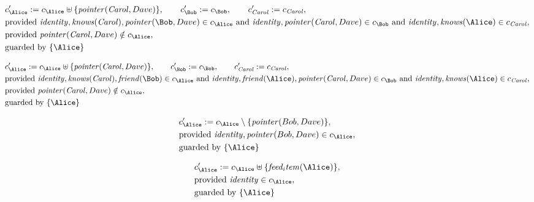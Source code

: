 \begin{align*}
&
c'_
{
\Alice
}
 := 
c_
{
\Alice
}
 \uplus 
\{
\mathit{
pointer
}
(
\mathit{Carol}
,
Dave
)
\}
, \qquad 
c'_
{
\Bob
}
 := 
c_
{
\Bob
}
, \qquad 
c'_
{
\mathit{Carol}
}
 := 
c_
{
\mathit{Carol}
}
,\\
&
\text{provided } 
\mathit{
identity
}
,
\mathit{
knows
}
(
\mathit{Carol}
)
,
\mathit{
pointer
}
(
\Bob
,
Dave
)
 \in c_
{
\Alice
}
 \text{ and } 
\mathit{
identity
}
,
\mathit{
pointer
}
(
\mathit{Carol}
,
Dave
)
 \in c_
{
\Bob
}
 \text{ and } 
\mathit{
identity
}
,
\mathit{
knows
}
(
\Alice
)
 \in c_
{
\mathit{Carol}
}
,\\
&
\text{provided } 
\mathit{
pointer
}
(
\mathit{Carol}
,
Dave
)
 \notin c_
{
\Alice
}
,\\
&
\text{guarded by } \{
\Alice
\}
\end{align*}

\begin{align*}
&
c'_
{
\Alice
}
 := 
c_
{
\Alice
}
 \uplus 
\{
\mathit{
pointer
}
(
\mathit{Carol}
,
Dave
)
\}
, \qquad 
c'_
{
\Bob
}
 := 
c_
{
\Bob
}
, \qquad 
c'_
{
\mathit{Carol}
}
 := 
c_
{
\mathit{Carol}
}
,\\
&
\text{provided } 
\mathit{
identity
}
,
\mathit{
knows
}
(
\mathit{Carol}
)
,
\mathit{
friend
}
(
\Bob
)
 \in c_
{
\Alice
}
 \text{ and } 
\mathit{
identity
}
,
\mathit{
friend
}
(
\Alice
)
,
\mathit{
pointer
}
(
\mathit{Carol}
,
Dave
)
 \in c_
{
\Bob
}
 \text{ and } 
\mathit{
identity
}
,
\mathit{
knows
}
(
\Alice
)
 \in c_
{
\mathit{Carol}
}
,\\
&
\text{provided } 
\mathit{
pointer
}
(
\mathit{Carol}
,
Dave
)
 \notin c_
{
\Alice
}
,\\
&
\text{guarded by } \{
\Alice
\}
\end{align*}

\begin{align*}
&
c'_
{
\Alice
}
 := 
c_
{
\Alice
}
 \setminus 
\{
\mathit{
pointer
}
(
Bob
,
Dave
)
\}
,\\
&
\text{provided } 
\mathit{
identity
}
,
\mathit{
pointer
}
(
Bob
,
Dave
)
 \in c_
{
\Alice
}
,\\
&
\text{guarded by } \{
\Alice
\}
\end{align*}

\begin{align*}
&
c'_
{
\Alice
}
 := 
c_
{
\Alice
}
 \uplus 
\{
\mathit{
feed_item
}
(
\Alice
)
\}
,\\
&
\text{provided } 
\mathit{
identity
}
 \in c_
{
\Alice
}
,\\
&
\text{guarded by } \{
\Alice
\}
\end{align*}
